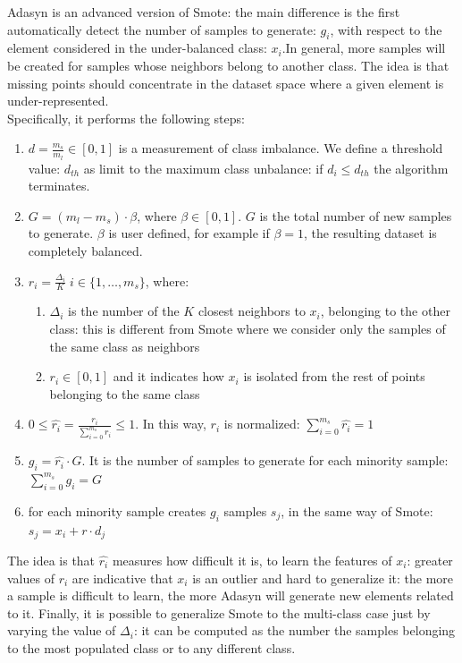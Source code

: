 \documentclass[LaM,binding=0.6cm]{sapthesis}
\begin{document}
Adasyn is an advanced version of Smote: the main difference is the first automatically detect the number of samples to generate: $g_i$, with respect to the element considered in the under-balanced class: $x_i$.In general, more samples will be created for samples whose neighbors belong to another class. The idea is that missing points should concentrate in the dataset space where a given element is under-represented.\\Specifically, it performs the following steps:
\begin{enumerate}
\item $d = \frac{m_s}{m_l} \in [0,1]$ is a measurement of class imbalance. We define a threshold value: $d_{th}$ as limit to the maximum class unbalance: if $d_i\le d_{th}$ the algorithm terminates.
\item $G=(m_l - m_s)\cdot \beta$, where $\beta \in [0,1]$. $G$ is the total number of new samples to generate. $\beta$ is user defined, for example if $\beta=1$, the resulting dataset is completely balanced.
\item $r_i = \frac{\Delta_i}{K} \; i \in \{1,\dots,m_{s}\}$, where:
\begin{enumerate}
\item  $\Delta_i$ is the number of the $K$ closest neighbors to $x_i$, belonging to the other class: this is different from Smote where we consider only the samples of the same class as neighbors
\item $r_i \in [0,1]$ and it indicates how $x_i$ is isolated from the rest of points belonging to the same class
\end{enumerate}
\item $0\leq \hat{r_i}=\frac{r_i}{\sum_{i=0}^{m_s}r_i }\leq 1$. In this way, $r_i$ is normalized: $\sum_{i=0}^{m_s}\hat{r_i} =1$
\item $g_i=\hat{r_i}\cdot G$. It is the number of samples to generate for each minority sample: $\sum_{i=0}^{m_s}g_i =G$ 
\item for each minority sample creates $g_i$ samples $s_j$, in the same way of Smote: $s_j = x_i+r\cdot d_j$
\end{enumerate}
The idea is that $\hat{r_i}$ measures how difficult it is, to learn the features of $x_i$: greater values of $r_i$ are indicative that $x_i$ is an outlier and hard to generalize it: the more a sample is difficult to learn, the more Adasyn will generate new elements related to it. Finally, it is possible to generalize Smote to the multi-class case just by varying the value of $\Delta_i$: it can be computed as the number the samples belonging to the most populated class or to any different class.
\end{document}

